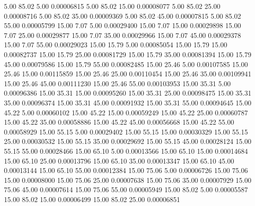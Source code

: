       5.00     85.02      5.00     0.00006815
      5.00     85.02     15.00     0.00008077
      5.00     85.02     25.00     0.00008716
      5.00     85.02     35.00     0.00009369
      5.00     85.02     45.00     0.00007815
      5.00     85.02     55.00     0.00005799
     15.00      7.07      5.00     0.00029400
     15.00      7.07     15.00     0.00029898
     15.00      7.07     25.00     0.00029877
     15.00      7.07     35.00     0.00029966
     15.00      7.07     45.00     0.00029378
     15.00      7.07     55.00     0.00029023
     15.00     15.79      5.00     0.00085054
     15.00     15.79     15.00     0.00082737
     15.00     15.79     25.00     0.00081729
     15.00     15.79     35.00     0.00081394
     15.00     15.79     45.00     0.00079586
     15.00     15.79     55.00     0.00082485
     15.00     25.46      5.00     0.00107585
     15.00     25.46     15.00     0.00115859
     15.00     25.46     25.00     0.00110454
     15.00     25.46     35.00     0.00109941
     15.00     25.46     45.00     0.00111230
     15.00     25.46     55.00     0.00103953
     15.00     35.31      5.00     0.00096386
     15.00     35.31     15.00     0.00095260
     15.00     35.31     25.00     0.00098475
     15.00     35.31     35.00     0.00096374
     15.00     35.31     45.00     0.00091932
     15.00     35.31     55.00     0.00094645
     15.00     45.22      5.00     0.00060102
     15.00     45.22     15.00     0.00059249
     15.00     45.22     25.00     0.00060787
     15.00     45.22     35.00     0.00058886
     15.00     45.22     45.00     0.00056668
     15.00     45.22     55.00     0.00058929
     15.00     55.15      5.00     0.00029402
     15.00     55.15     15.00     0.00030329
     15.00     55.15     25.00     0.00030532
     15.00     55.15     35.00     0.00029692
     15.00     55.15     45.00     0.00028124
     15.00     55.15     55.00     0.00028466
     15.00     65.10      5.00     0.00013566
     15.00     65.10     15.00     0.00014684
     15.00     65.10     25.00     0.00013796
     15.00     65.10     35.00     0.00013347
     15.00     65.10     45.00     0.00013144
     15.00     65.10     55.00     0.00012384
     15.00     75.06      5.00     0.00006726
     15.00     75.06     15.00     0.00008000
     15.00     75.06     25.00     0.00007638
     15.00     75.06     35.00     0.00007929
     15.00     75.06     45.00     0.00007614
     15.00     75.06     55.00     0.00005949
     15.00     85.02      5.00     0.00005587
     15.00     85.02     15.00     0.00006499
     15.00     85.02     25.00     0.00006851
